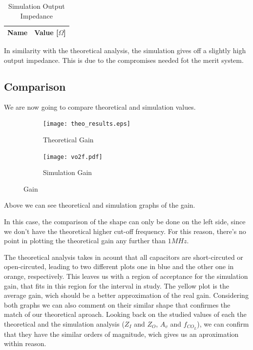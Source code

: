 \begin{table}[h]
    \centering
    \begin{tabular}{|l|c|}
    \hline
    {\bf Name} & {\bf Value [$\Omega$]} \\ \hline
    
    \end{tabular}
    \caption{Simulation Output Impedance}
    \label{tab:simulation_output_imp}
\end{table}

In similarity with the theoretical analysis, the simulation gives off a slightly high output impedance. This is due to the compromises needed fot the merit system.
\pagebreak

\subsection{Comparison}
\label{subsec:comparison}

We are now going to compare theoretical and simulation values.

\vspace{-2.5cm}

\begin{figure}[h]
\centering
\begin{subfigure}{.5\textwidth}
    \centering
    \vspace{2.8 cm}
    \texttt{[image: theo\_results.eps]}
    \caption{Theoretical Gain}
\end{subfigure}%
\begin{subfigure}{.5\textwidth}
    \centering
    \texttt{[image: vo2f.pdf]}
    \caption{Simulation Gain}
\end{subfigure}
\caption{Gain}
\label{fig:Gain}
\end{figure}

Above we can see theoretical and simulation graphs of the gain.

In this case, the comparison of the shape can only be done on the left side, since we don't have the theoretical higher cut-off frequency. For this reason, there's no point in plotting the theoretical gain any further than $1 MHz$.

The theoretical analysis takes in acount that all capacitors are short-circuted or open-circuted, leading to two different plots one in blue and the other one in orange, respectively. This leaves us with a region of acceptance for the simulation gain, that fits in this region for the interval in study. The yellow plot is the average gain, wich should be a better approximation of the real gain. Considering both graphs we can also comment on their similar shape that confirmes the match of our theoretical aproach. Looking back on the studied values of each the theoretical and the simulation analysis ($Z_I$ and $Z_O$, $A_v$ and $f_{CO_L}$), we can confirm that they have the similar orders of magnitude, wich gives us an aproximation within reason.

